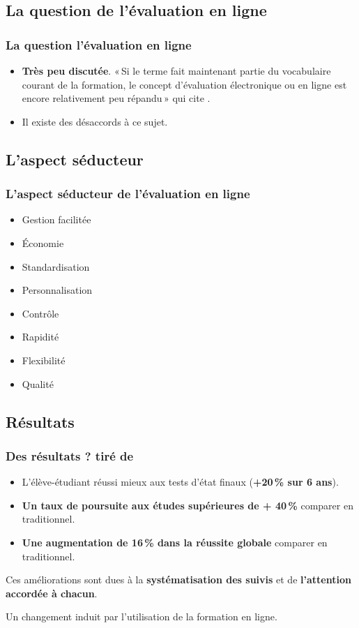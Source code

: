 \documentclass{beamer}
\begin{document}
		\subsection{La question de l'évaluation en ligne} 
		\begin{frame}
			\frametitle{La question l'évaluation en ligne}
			\begin {itemize}
				\item \textbf{Très peu discutée}. «\,Si le terme fait maintenant partie du vocabulaire courant de la formation, le concept d'évaluation électronique ou en ligne est encore relativement peu répandu\,» \citep{audet2011a} qui cite \citet{buzzetto2006a}. 
				\item Il existe des désaccords à ce sujet.
				
			\end{itemize}
		\end{frame}
		
	\subsection{L'aspect séducteur} 
		\begin{frame}
			\frametitle{L'aspect séducteur de l'évaluation en ligne\citep{Lamontagne2013}}
			\begin {itemize}
				\item Gestion facilitée
				\item Économie
				\item Standardisation
				\item Personnalisation
				\item Contrôle
				\item Rapidité
				\item Flexibilité
				\item Qualité
			\end{itemize}
		\end{frame}
	
	\subsection{Résultats} 
		\begin{frame}
			\frametitle{Des résultats ? \citep{Lamontagne2013} tiré de \citet {Stansbury2013C}}
			
			\begin {itemize}
				\item L'élève-étudiant réussi mieux aux tests d'état finaux (\textbf{+20\,\% sur 6 ans}).
				\item \textbf{Un taux de poursuite aux études supérieures de + 40\,\%} comparer en traditionnel.
				\item \textbf{Une augmentation de 16\,\% dans la réussite globale} comparer en traditionnel.
			\end{itemize}
			
			\par Ces améliorations sont dues à la \textbf{systématisation des suivis} et de \textbf{l'attention accordée à chacun}.
			\par \alert{Un changement induit par l'utilisation de la formation en ligne}. 
			
		\end{frame}
	
\end{document}
